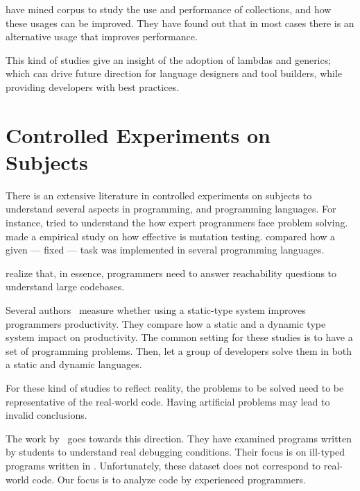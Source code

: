 \cite{costaEmpiricalStudyUsage2017} have mined \github{} corpus to study the use and performance of collections, and how these usages can be improved.
They have found out that in most cases there is an alternative usage that improves performance.

This kind of studies give an insight of the adoption of lambdas and generics; which can drive future direction for language designers and tool builders, while providing developers with best practices.


\section{Controlled Experiments on Subjects}
\label{sec:rw:experiments}

There is an extensive literature \perse{} in controlled experiments on subjects to understand several aspects in programming, and programming languages.
For instance, \cite{solowayEmpiricalStudiesProgramming1984} tried to understand the how expert programmers face problem solving.
\cite{buddTheoreticalEmpiricalStudies1980} made a empirical study on how effective is mutation testing.
\cite{precheltEmpiricalComparisonSeven2000} compared how a given --- fixed --- task was implemented in several programming languages.

\cite{latozaDevelopersAskReachability2010} realize that, in essence, programmers need to answer reachability questions to understand large codebases.

Several authors~\cite{stuchlikStaticVsDynamic2011,mayerEmpiricalStudyInfluence2012,harlinImpactUsingStaticType2017} measure whether using a static-type system improves programmers productivity.
They compare how a static and a dynamic type system impact on productivity.
The common setting for these studies is to have a set of programming problems.
Then, let a group of developers solve them in both a static and dynamic languages.

For these kind of studies to reflect reality, the problems to be solved need to be representative of the real-world code.
Having artificial problems may lead to invalid conclusions.

The work by~\cite{wuHowTypeErrors2017,wuLearningUserFriendly2017} goes towards this direction. 
They have examined programs written by students to understand real debugging conditions. 
Their focus is on ill-typed programs written in \haskell{}.
Unfortunately, these dataset does not correspond to real-world code. 
Our focus is to analyze code by experienced programmers. 

